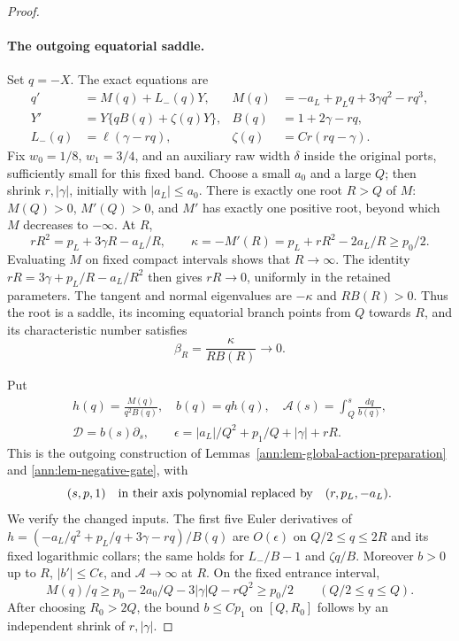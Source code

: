 \begin{proof}
\paragraph{The outgoing equatorial saddle.}
Set \(q=-X\).  The exact equations are
\begin{equation}\label{deg:trace-negative-field}
\begin{aligned}
 q'&=M(q)+L_-(q)Y,&M(q)&=-a_L+p_Lq+3\gamma q^2-rq^3,\\
 Y'&=Y\{qB(q)+\zeta(q)Y\},&B(q)&=1+2\gamma-rq,\\
 L_-(q)&=\ell(\gamma-rq),&\zeta(q)&=Cr(rq-\gamma).
\end{aligned}
\end{equation}
Fix \(w_0=1/8\), \(w_1=3/4\), and an auxiliary raw width
\(\delta\) inside the original ports, sufficiently small for this
fixed band. Choose a small \(a_0\) and a large \(Q\); then shrink
\(r,|\gamma|\), initially with \(|a_L|\le a_0\).
There is exactly one root \(R>Q\) of \(M\): \(M(Q)>0\),
\(M'(Q)>0\), and \(M'\) has exactly one positive root, beyond
which \(M\) decreases to \(-\infty\).  At \(R\),
\[
 rR^2=p_L+3\gamma R-a_L/R,\qquad
 \kappa=-M'(R)=p_L+rR^2-2a_L/R\ge p_0/2.
\]
Evaluating \(M\) on fixed compact intervals shows that \(R\to\infty\).
The identity \(rR=3\gamma+p_L/R-a_L/R^2\) then gives \(rR\to0\),
uniformly in the retained parameters.  The tangent and normal
eigenvalues are \(-\kappa\) and \(RB(R)>0\).  Thus the root is a
saddle, its incoming equatorial branch points from \(Q\) towards \(R\),
and its characteristic number satisfies
\[
 \beta_R=\frac{\kappa}{RB(R)}\longrightarrow0.
\]

Put
\[
 \begin{gathered}
 h(q)=\frac{M(q)}{q^2B(q)},\quad b(q)=qh(q),\quad
 \mathcal A(s)=\int_Q^s\frac{dq}{b(q)},\\
 \mathcal D=b(s)\partial_s,\qquad
 \epsilon=|a_L|/Q^2+p_1/Q+|\gamma|+rR.
 \end{gathered}
\]
This is the outgoing construction of
Lemmas~\ref{ann:lem-global-action-preparation} and
\ref{ann:lem-negative-gate}, with
\[
 (s,p,1)\quad\hbox{in their axis polynomial replaced by}\quad
 (r,p_L,-a_L).
\]
We verify the changed inputs. The first five Euler derivatives of
\(h=(-a_L/q^2+p_L/q+3\gamma-rq)/B(q)\) are \(O(\epsilon)\)
on \(Q/2\le q\le2R\) and its fixed logarithmic collars; the same
holds for \(L_-/B-1\) and \(\zeta q/B\). Moreover
\(b>0\) up to \(R\), \(|b'|\le C\epsilon\), and
\(\mathcal A\to\infty\) at \(R\). On the fixed entrance interval,
\[
 M(q)/q\ge p_0-2a_0/Q-3|\gamma|Q-rQ^2\ge p_0/2
 \qquad(Q/2\le q\le Q).
\]
After choosing \(R_0>2Q\), the bound \(b\le Cp_1\) on
\([Q,R_0]\) follows by an independent shrink of \(r,|\gamma|\).


\end{proof}
